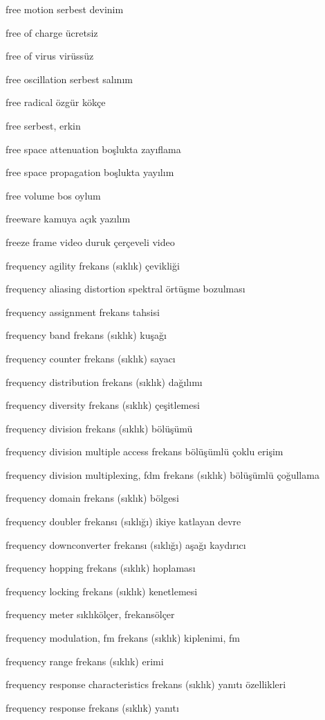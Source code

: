 \documentclass[12pt,fleqn]{article}\usepackage{../../common}
\begin{document}
free motion serbest devinim

free of charge ücretsiz

free of virus virüssüz

free oscillation serbest salınım

free radical özgür kökçe

free serbest, erkin

free space attenuation boşlukta zayıflama

free space propagation boşlukta yayılım

free volume bos oylum

freeware kamuya açık yazılım

freeze frame video duruk çerçeveli video

frequency agility frekans (sıklık) çevikliği

frequency aliasing distortion spektral örtüşme bozulması

frequency assignment frekans tahsisi

frequency band frekans (sıklık) kuşağı

frequency counter frekans (sıklık) sayacı

frequency distribution frekans (sıklık) dağılımı

frequency diversity frekans (sıklık) çeşitlemesi

frequency division frekans (sıklık) bölüşümü

frequency division multiple access frekans bölüşümlü çoklu erişim

frequency division multiplexing, fdm frekans (sıklık) bölüşümlü çoğullama

frequency domain frekans (sıklık) bölgesi

frequency doubler frekansı (sıklığı) ikiye katlayan devre

frequency downconverter frekansı (sıklığı) aşağı kaydırıcı

frequency hopping frekans (sıklık) hoplaması

frequency locking frekans (sıklık) kenetlemesi

frequency meter sıklıkölçer, frekansölçer

frequency modulation, fm frekans (sıklık) kiplenimi, fm

frequency range frekans (sıklık) erimi

frequency response characteristics frekans (sıklık) yanıtı özellikleri

frequency response frekans (sıklık) yanıtı
\end{document}
